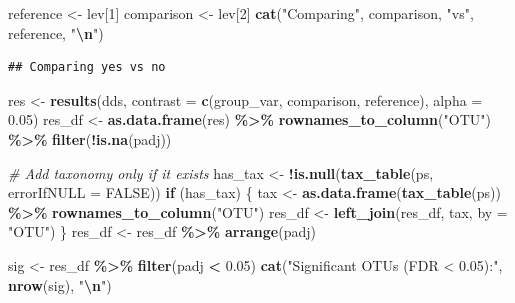 \documentclass[
]{article}
\newenvironment{Shaded}{\begin{snugshade}}{\end{snugshade}}
\newcommand{\AttributeTok}[1]{\textcolor[rgb]{0.13,0.29,0.53}{#1}}
\newcommand{\CommentTok}[1]{\textcolor[rgb]{0.56,0.35,0.01}{\textit{#1}}}
\newcommand{\ConstantTok}[1]{\textcolor[rgb]{0.56,0.35,0.01}{#1}}
\newcommand{\ControlFlowTok}[1]{\textcolor[rgb]{0.13,0.29,0.53}{\textbf{#1}}}
\newcommand{\DecValTok}[1]{\textcolor[rgb]{0.00,0.00,0.81}{#1}}
\newcommand{\FloatTok}[1]{\textcolor[rgb]{0.00,0.00,0.81}{#1}}
\newcommand{\FunctionTok}[1]{\textcolor[rgb]{0.13,0.29,0.53}{\textbf{#1}}}
\newcommand{\NormalTok}[1]{#1}
\newcommand{\OtherTok}[1]{\textcolor[rgb]{0.56,0.35,0.01}{#1}}
\newcommand{\SpecialCharTok}[1]{\textcolor[rgb]{0.81,0.36,0.00}{\textbf{#1}}}
\newcommand{\StringTok}[1]{\textcolor[rgb]{0.31,0.60,0.02}{#1}}
\begin{document}
\begin{Shaded}
\begin{Highlighting}[]
\NormalTok{reference  }\OtherTok{\textless{}{-}}\NormalTok{ lev[}\DecValTok{1}\NormalTok{]}
\NormalTok{comparison }\OtherTok{\textless{}{-}}\NormalTok{ lev[}\DecValTok{2}\NormalTok{]}
\FunctionTok{cat}\NormalTok{(}\StringTok{"Comparing"}\NormalTok{, comparison, }\StringTok{"vs"}\NormalTok{, reference, }\StringTok{"}\SpecialCharTok{\textbackslash{}n}\StringTok{"}\NormalTok{)}
\end{Highlighting}
\end{Shaded}

\begin{verbatim}
## Comparing yes vs no
\end{verbatim}

\begin{Shaded}
\begin{Highlighting}[]
\NormalTok{res }\OtherTok{\textless{}{-}} \FunctionTok{results}\NormalTok{(dds, }\AttributeTok{contrast =} \FunctionTok{c}\NormalTok{(group\_var, comparison, reference), }\AttributeTok{alpha =} \FloatTok{0.05}\NormalTok{)}
\NormalTok{res\_df }\OtherTok{\textless{}{-}} \FunctionTok{as.data.frame}\NormalTok{(res) }\SpecialCharTok{\%\textgreater{}\%}
  \FunctionTok{rownames\_to\_column}\NormalTok{(}\StringTok{"OTU"}\NormalTok{) }\SpecialCharTok{\%\textgreater{}\%}
  \FunctionTok{filter}\NormalTok{(}\SpecialCharTok{!}\FunctionTok{is.na}\NormalTok{(padj))}

\CommentTok{\# Add taxonomy only if it exists}
\NormalTok{has\_tax }\OtherTok{\textless{}{-}} \SpecialCharTok{!}\FunctionTok{is.null}\NormalTok{(}\FunctionTok{tax\_table}\NormalTok{(ps, }\AttributeTok{errorIfNULL =} \ConstantTok{FALSE}\NormalTok{))}
\ControlFlowTok{if}\NormalTok{ (has\_tax) \{}
\NormalTok{  tax }\OtherTok{\textless{}{-}} \FunctionTok{as.data.frame}\NormalTok{(}\FunctionTok{tax\_table}\NormalTok{(ps)) }\SpecialCharTok{\%\textgreater{}\%} \FunctionTok{rownames\_to\_column}\NormalTok{(}\StringTok{"OTU"}\NormalTok{)}
\NormalTok{  res\_df }\OtherTok{\textless{}{-}} \FunctionTok{left\_join}\NormalTok{(res\_df, tax, }\AttributeTok{by =} \StringTok{"OTU"}\NormalTok{)}
\NormalTok{\}}
\NormalTok{res\_df }\OtherTok{\textless{}{-}}\NormalTok{ res\_df }\SpecialCharTok{\%\textgreater{}\%} \FunctionTok{arrange}\NormalTok{(padj)}

\NormalTok{sig }\OtherTok{\textless{}{-}}\NormalTok{ res\_df }\SpecialCharTok{\%\textgreater{}\%} \FunctionTok{filter}\NormalTok{(padj }\SpecialCharTok{\textless{}} \FloatTok{0.05}\NormalTok{)}
\FunctionTok{cat}\NormalTok{(}\StringTok{"Significant OTUs (FDR \textless{} 0.05):"}\NormalTok{, }\FunctionTok{nrow}\NormalTok{(sig), }\StringTok{"}\SpecialCharTok{\textbackslash{}n}\StringTok{"}\NormalTok{)}
\end{Highlighting}
\end{Shaded}
\end{document}
